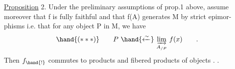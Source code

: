 \uline{Proposition} 2. Under the preliminary assumptions of prop.1 above, assume
moreover that f is fully faithful\hand{,}  and that f(A) generates M by strict epimor-%
phisms i.e. that for any object P in M, we have
\[ \hand{(***)}\qquad P\ \hand{\xleftarrow{\sim}}\ \underset{A_{/P}}{\varinjlim}\ f(x) \qquad . \]
Then $f_{\hand{!}}$ commutes to   products\hand{,}  and  fibered products  of objects   .
.


